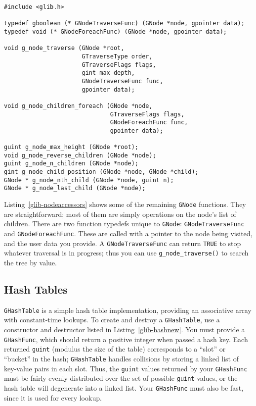 \begin{lstlisting}[float, caption={Accessing a \lstinline{GNode}}, label=glib-nodeaccessors]
#include <glib.h>

typedef gboolean (* GNodeTraverseFunc) (GNode *node, gpointer data);
typedef void (* GNodeForeachFunc) (GNode *node, gpointer data);

void g_node_traverse (GNode *root,
                      GTraverseType order,
                      GTraverseFlags flags,
                      gint max_depth,
                      GNodeTraverseFunc func,
                      gpointer data);

void g_node_children_foreach (GNode *node,
                              GTraverseFlags flags,
                              GNodeForeachFunc func,
                              gpointer data);

guint g_node_max_height (GNode *root);
void g_node_reverse_children (GNode *node);
guint g_node_n_children (GNode *node);
gint g_node_child_position (GNode *node, GNode *child);
GNode * g_node_nth_child (GNode *node, guint n);
GNode * g_node_last_child (GNode *node);
\end{lstlisting}

Listing~\ref{glib-nodeaccessors} shows some of the remaining \lstinline{GNode} functions. They are straightforward; most of them are simply operations on the node's list of children. There are two function typedefs unique to \lstinline{GNode}: \lstinline{GNodeTraverseFunc} and \lstinline{GNodeForeachFunc}. These are called with a pointer to the node being visited, and the user data you provide. A \lstinline{GNodeTraverseFunc} can return \lstinline{TRUE} to stop whatever traversal is in progress; thus you can use \lstinline{g_node_traverse()} to search the tree by value.

\subsection{Hash Tables}

\lstinline{GHashTable} is a simple hash table implementation, providing an associative array with constant-time lookups. To create and destroy a \lstinline{GHashTable}, use a constructor and destructor listed in Listing~\ref{glib-hashnew}. You must provide a \lstinline{GHashFunc}, which should return a positive integer when passed a hash key. Each returned \lstinline{guint} (modulus the size of the table) corresponds to a ``slot'' or ``bucket'' in the hash; \lstinline{GHashTable} handles collisions by storing a linked list of key-value pairs in each slot. Thus, the \lstinline{guint} values returned by your \lstinline{GHashFunc} must be fairly evenly distributed over the set of possible \lstinline{guint} values, or the hash table will degenerate into a linked list. Your \lstinline{GHashFunc} must also be fast, since it is used for every lookup.

